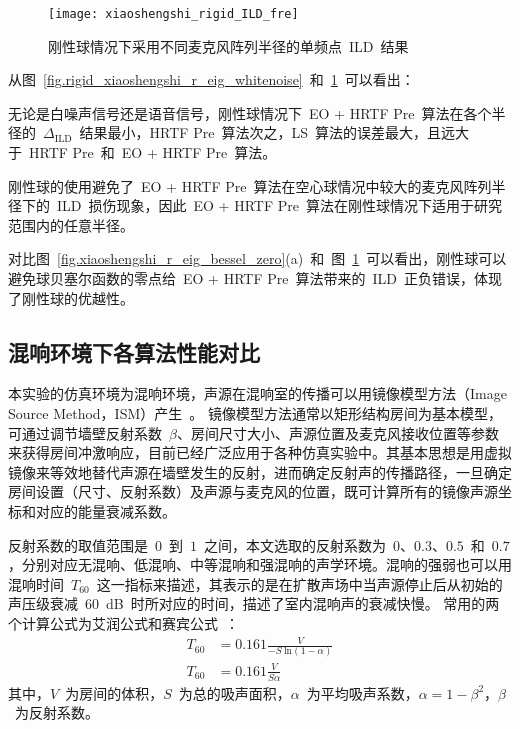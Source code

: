 \begin{figure}[H]
\centering
\texttt{[image: xiaoshengshi\_rigid\_ILD\_fre]}
\caption{刚性球情况下采用不同麦克风阵列半径的单频点~ILD~结果}
\label{fig:xiaoshengshi_rigid_ILD_fre}
\end{figure}


从图~\ref{fig.rigid_xiaoshengshi_r_eig_whitenoise}~和~\ref{fig:xiaoshengshi_rigid_ILD_fre}~可以看出：

\begin{inparaenum}[（1）]

\item 无论是白噪声信号还是语音信号，刚性球情况下~EO + HRTF Pre~算法在各个半径的~$\Delta_{\text{ILD}}$~结果最小，HRTF Pre~算法次之，LS~算法的误差最大，且远大于~HRTF Pre~和~EO + HRTF Pre~算法。

\item 刚性球的使用避免了~EO + HRTF Pre~算法在空心球情况中较大的麦克风阵列半径下的~ILD~损伤现象，因此~EO + HRTF Pre~算法在刚性球情况下适用于研究范围内的任意半径。

\item 对比图~\ref{fig.xiaoshengshi_r_eig_bessel_zero}(a)~和~图~\ref{fig:xiaoshengshi_rigid_ILD_fre}~可以看出，刚性球可以避免球贝塞尔函数的零点给~EO + HRTF Pre~算法带来的~ILD~正负错误，体现了刚性球的优越性。

\end{inparaenum}

\subsection{混响环境下各算法性能对比}

本实验的仿真环境为混响环境，声源在混响室的传播可以用镜像模型方法（Image Source Method，ISM）产生~。
镜像模型方法通常以矩形结构房间为基本模型，可通过调节墙壁反射系数~$\beta$、房间尺寸大小、声源位置及麦克风接收位置等参数来获得房间冲激响应，目前已经广泛应用于各种仿真实验中。其基本思想是用虚拟镜像来等效地替代声源在墙壁发生的反射，进而确定反射声的传播路径，一旦确定房间设置（尺寸、反射系数）及声源与麦克风的位置，既可计算所有的镜像声源坐标和对应的能量衰减系数。

反射系数的取值范围是~$0$~到~$1$~之间，本文选取的反射系数为~$0$、$0.3$、$0.5$~和~$0.7$，分别对应无混响、低混响、中等混响和强混响的声学环境。混响的强弱也可以用混响时间~$T_{60}$~这一指标来描述，其表示的是在扩散声场中当声源停止后从初始的声压级衰减~60~dB~时所对应的时间，描述了室内混响声的衰减快慢。
常用的两个计算公式为艾润公式和赛宾公式~：
\begin{align}
T_{60} & = 0.161 \frac{V}{-S ~\text{ln}(1-\alpha)} \nonumber\\
T_{60} & = 0.161 \frac{V}{S \alpha}
\end{align}
其中，$V$~为房间的体积，$S$~为总的吸声面积，$\alpha$~为平均吸声系数，$\alpha = 1-\beta^{2}$，$\beta$~为反射系数。

